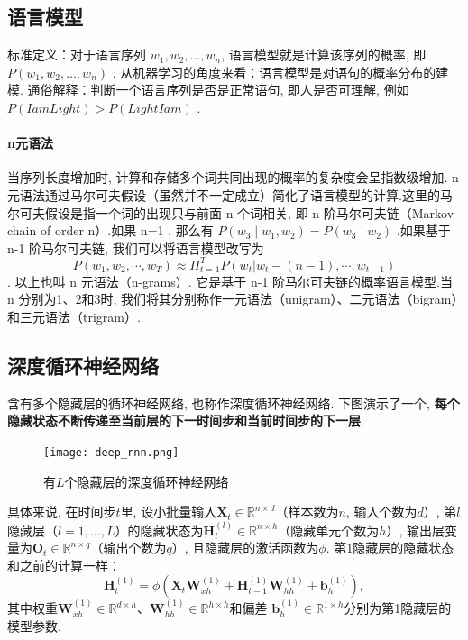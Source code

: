 \subsection{语言模型}

标准定义：对于语言序列 $w_1, w_2, \dots,  w_n$, 语言模型就是计算该序列的概率, 即 $P(w_1, w_2,  \dots,  w_n)$ .
从机器学习的角度来看：语言模型是对语句的概率分布的建模.
通俗解释：判断一个语言序列是否是正常语句, 即人是否可理解, 例如 $P(I am Light) > P(Light I am)$ .
\paragraph{n元语法}

当序列长度增加时, 计算和存储多个词共同出现的概率的复杂度会呈指数级增加. n 元语法通过马尔可夫假设（虽然并不一定成立）简化了语言模型的计算.这里的马尔可夫假设是指一个词的出现只与前面 n 个词相关, 即 n 阶马尔可夫链（Markov chain of order n）.如果 n=1 , 那么有 $P(w_3∣w_1, w_2)=P(w_3∣w_2)$ .如果基于 n-1 阶马尔可夫链, 我们可以将语言模型改写为
$$P(w_1, w_2, \cdots , w_T) \approx \Pi_{t=1}^T P(w_t|w_t-(n-1), \cdots, w_{t-1})$$.
以上也叫 n 元语法（n-grams）. 它是基于 n-1 阶马尔可夫链的概率语言模型.当 n 分别为1、2和3时, 我们将其分别称作一元语法（unigram）、二元语法（bigram）和三元语法（trigram）.

\subsection{深度循环神经网络}
含有多个隐藏层的循环神经网络, 也称作深度循环神经网络. 下图演示了一个, \textbf{每个隐藏状态不断传递至当前层的下一时间步和当前时间步的下一层}. 

 \begin{figure}[!htb]
    \center
\texttt{[image: deep\_rnn.png]}
\caption{有$L$个隐藏层的深度循环神经网络}
\end{figure}
 

具体来说, 在时间步$t$里, 设小批量输入$\mathbf{X}_t \in \mathbb{R}^{n \times d}$（样本数为$n$, 输入个数为$d$）, 第$l$隐藏层（$l=1, \ldots, L$）的隐藏状态为$\mathbf{H}_t^{(l)}  \in \mathbb{R}^{n \times h}$（隐藏单元个数为$h$）, 输出层变量为$\mathbf{O}_t \in \mathbb{R}^{n \times q}$（输出个数为$q$）, 且隐藏层的激活函数为$\phi$. 第1隐藏层的隐藏状态和之前的计算一样：
$$\mathbf{H}_t^{(1)} = \phi(\mathbf{X}_t \mathbf{W}_{xh}^{(1)} + \mathbf{H}_{t-1}^{(1)} \mathbf{W}_{hh}^{(1)}  + \mathbf{b}_h^{(1)}), $$
其中权重$\mathbf{W}_{xh}^{(1)} \in \mathbb{R}^{d \times h}$、$\mathbf{W}_{hh}^{(1)} \in \mathbb{R}^{h \times h}$和偏差 $\mathbf{b}_h^{(1)} \in \mathbb{R}^{1 \times h}$分别为第1隐藏层的模型参数. 


